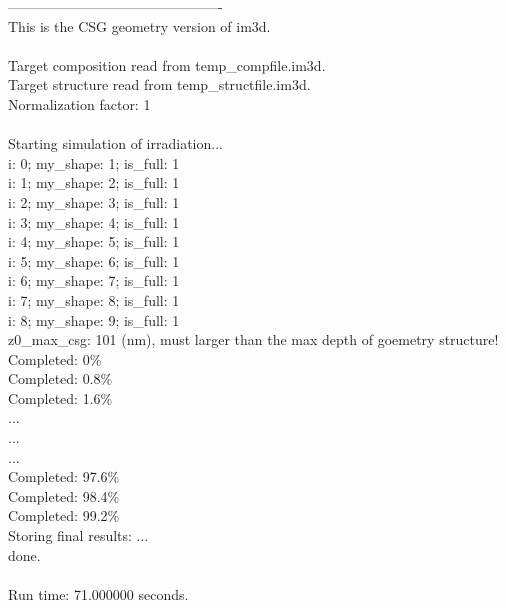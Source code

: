 ----------------------------------------------\\
This is the CSG geometry version of im3d.\\
\\
Target composition read from temp\_compfile.im3d.\\
Target structure read from temp\_structfile.im3d.\\
Normalization factor:	1\\
\\
Starting simulation of irradiation...\\
i: 0; my\_shape:  1; is\_full:   1\\
i: 1; my\_shape:  2; is\_full:   1\\
i: 2; my\_shape:  3; is\_full:   1\\
i: 3; my\_shape:  4; is\_full:   1\\
i: 4; my\_shape:  5; is\_full:   1\\
i: 5; my\_shape:  6; is\_full:   1\\
i: 6; my\_shape:  7; is\_full:   1\\
i: 7; my\_shape:  8; is\_full:   1\\
i: 8; my\_shape:  9; is\_full:   1\\
z0\_max\_csg: 101 (nm), must larger than the max depth of goemetry structure!\\
Completed: 0\%\\
Completed: 0.8\%\\
Completed: 1.6\%\\
...\\
...\\
...\\
Completed: 97.6\%\\
Completed: 98.4\%\\
Completed: 99.2\%\\
Storing final results: ...\\
 done.\\
\\
Run time: 71.000000 seconds.



